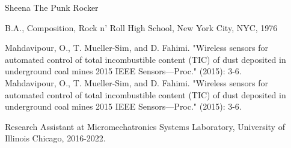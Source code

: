 \vita
\begin{singlespace}
    \begin{description}[labelwidth=4cm,leftmargin=4.2cm,itemsep=1em]

        \item[NAME] Sheena The Punk Rocker

        \item[EDUCATION] B.A., Composition, Rock n' Roll High School, New York City, NYC, 1976


        \item[PUBLICATIONS]
            \begin{itemize}[label={},listparindent=0pt,itemindent=0pt,leftmargin=0pt,itemsep=1em,parsep=0pt,topsep=0pt,partopsep=0pt]



                
                                Mahdavipour, O., T. Mueller-Sim, and D. Fahimi. "Wireless sensors for automated control of total incombustible content (TIC) of dust deposited in underground coal mines 2015 IEEE Sensors—Proc." (2015): 3-6.\\
                                
                                
                                Mahdavipour, O., T. Mueller-Sim, and D. Fahimi. "Wireless sensors for automated control of total incombustible content (TIC) of dust deposited in underground coal mines 2015 IEEE Sensors—Proc." (2015): 3-6.
                
            \end{itemize}
	\item[EXPERIENCE]
		 \begin{itemize}[label={},listparindent=0pt,itemindent=0pt,leftmargin=0pt,itemsep=1em,parsep=0pt,topsep=0pt,partopsep=0pt]
        			Research Assistant at Micromechatronics Systems Laboratory, University of Illinois Chicago, 2016-2022.\\
   			

\end{itemize}
\end{description}
\end{singlespace}
